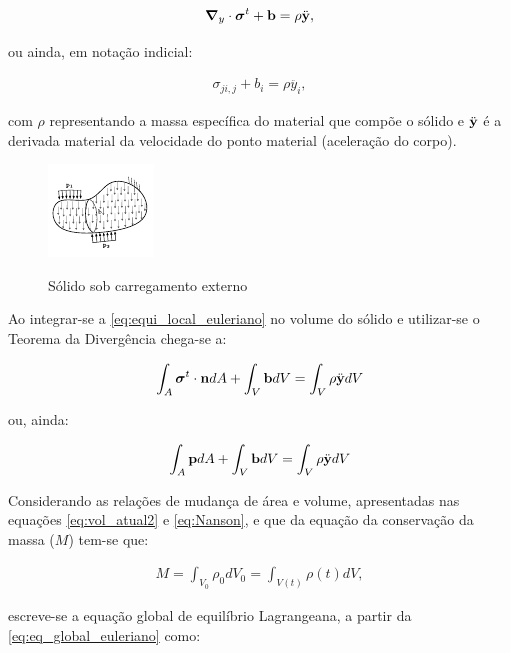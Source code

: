 \begin{align}
	\boldsymbol{\nabla}_y \cdot \boldsymbol{\sigma}^{t} + \mathbf{b} = \rho  \ddot{\mathbf{y}}, \label{eq:equi_local_euleriano}
\end{align}

\noindent ou ainda, em notação indicial:

\begin{align}
	\sigma_{ji,j} + b_i  = \rho  \ddot{y_i},
\end{align}

\noindent com $\rho$ representando a massa específica do material que compõe o sólido e $\ddot{\mathbf{y}}$ é a derivada material da velocidade do ponto material (aceleração do corpo).

\begin{figure}[!htbp]
	\caption{Sólido sob carregamento externo}
	\centering
	\includegraphics[scale=4,trim=0cm 0.0cm 0cm 0cm, clip=true]{Imagens/Cap4/sol_cargas.pdf}	
	\label{fig:sol_cargas}
\end{figure}

Ao integrar-se a \autoref{eq:equi_local_euleriano} no volume do sólido e utilizar-se o Teorema da Divergência chega-se a:

\begin{align}
	\int_{A} {\boldsymbol{\sigma}}^{t} \cdot \mathbf{n} dA + \int_{V} \mathbf{b} dV = \int_{V} \rho  \ddot{\mathbf{y}} dV \label{eq:eq_global_euleriano}
\end{align}

\noindent ou, ainda:

\begin{align}
	\int_{A} \mathbf{p} dA + \int_{V} \mathbf{b} dV = \int_{V} \rho  \ddot{\mathbf{y}} dV 
\end{align}

Considerando as relações de mudança de área e volume, apresentadas nas equações \autoref{eq:vol_atual2} e \autoref{eq:Nanson}, e que da equação da conservação da massa ($M$) tem-se que:

\begin{align}
	M = \int_{V_{0}} \rho_{0}dV_{0} = \int_{V(t)} \rho(t)dV, \label{eq:conser_massa}
\end{align}

\noindent escreve-se a equação global de equilíbrio Lagrangeana, a partir da \autoref{eq:eq_global_euleriano} como:

